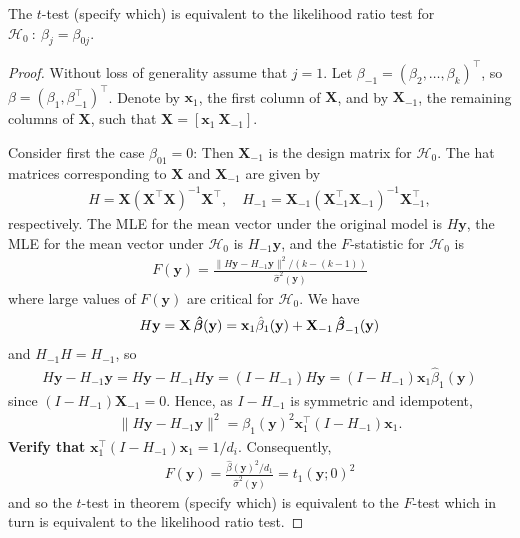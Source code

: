 \begin{theorem}
    The $t$-test (specify which) is equivalent to the likelihood ratio test for $\mathcal{H}_0 \ : \ \beta_j = \beta_{0j}$.
\end{theorem}
\begin{proof}
    Without loss of generality assume that $j = 1$.
    Let $\beta_{-1} = (\beta_2, \ldots, \beta_k)^\top$, so $\beta = (\beta_1, \beta_{-1}^\top)^\top$.
    Denote by $\textbf{x}_1$, the first column of $\textbf{X}$, and by $\textbf{X}_{-1}$, the remaining columns of $\textbf{X}$, such that $\textbf{X} = \left[\textbf{x}_1 \ \textbf{X}_{-1}\right]$.
    
    Consider first the case $\beta_{01} = 0$: Then $\textbf{X}_{-1}$ is the design matrix for $\mathcal{H}_0$.
    The hat matrices corresponding to $\textbf{X}$ and $\textbf{X}_{-1}$ are given by
    \begin{align*}
        H = \textbf{X}(\textbf{X}^\top\textbf{X})^{-1}\textbf{X}^\top, \quad H_{-1} = \textbf{X}_{-1}(\textbf{X}^\top_{-1}\textbf{X}_{-1})^{-1}\textbf{X}^\top_{-1},
    \end{align*}
    respectively.
    The MLE for the mean vector under the original model is $H\textbf{y}$, the MLE for the mean vector under $\mathcal{H}_0$ is $H_{-1}\textbf{y}$, and the $F$-statistic for $\mathcal{H}_0$ is
    \begin{align*}
        F(\textbf{y}) = \frac{\|H\textbf{y} - H_{-1}\textbf{y}\|^2/(k-(k-1))}{\hat{\sigma}^2(\textbf{y})}
    \end{align*}
    where large values of $F(\textbf{y})$ are critical for $\mathcal{H}_0$.
    We have
    \begin{align*}
        H\textbf{y} = \textbf{X}\operatorname{\boldsymbol{\hat{\beta}}}(\textbf{y}) = \textbf{x}_1\hat{\beta}_1(\textbf{y}) + \textbf{X}_{-1} \operatorname{\boldsymbol{\hat{\beta}}}_{-1}(\textbf{y})
    \end{align*}
    and $H_{-1}H = H_{-1}$, so
    \begin{align*}
        H\textbf{y}-H_{-1}\textbf{y} = 
        H\textbf{y}-H_{-1}H\textbf{y} =
        (I - H_{-1})H\textbf{y} = 
        (I - H_{-1})\textbf{x}_1\hat{\beta}_1(\textbf{y})
    \end{align*}
    since $(I - H_{-1})\textbf{X}_{-1} = 0$.
    Hence, as $I - H_{-1}$ is symmetric and idempotent,
    \begin{align*}
        \|H\textbf{y} - H_{-1}\textbf{y}\|^2 = \beta_1(\textbf{y})^2\textbf{x}_1^\top(I - H_{-1})\textbf{x}_1.
    \end{align*}
    \textbf{Verify that} $\textbf{x}_1^\top(I - H_{-1})\textbf{x}_1 = 1/d_i$.
    Consequently,
    \begin{align*}
        F(\textbf{y}) = \frac{\hat{\beta}(\textbf{y})^2/d_1}{\hat{\sigma}^2(\textbf{y})} = t_1(\textbf{y};0)^2
    \end{align*}
    and so the $t$-test in theorem (specify which) is equivalent to the $F$-test which in turn is equivalent to the likelihood ratio test.
    

\end{proof}
